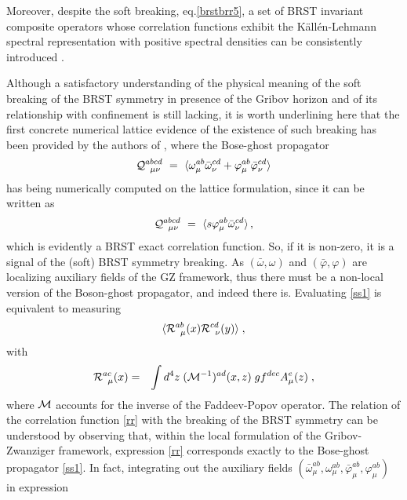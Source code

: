 Moreover, despite the soft breaking, eq.\eqref{brstbrr5}, a set of BRST  invariant composite operators whose correlation functions exhibit the K{\"a}ll{\'e}n-Lehmann spectral representation with positive spectral densities can be consistently introduced \cite{Baulieu:2009ha}. 

Although a satisfactory understanding of the physical meaning of the soft breaking of the BRST
symmetry in presence of the Gribov horizon and of its relationship with confinement is still
lacking, it is worth  underlining here that the first concrete numerical lattice evidence  of
the existence of such breaking has been provided by the authors of \cite{Cucchieri:2014via},
where the Bose-ghost propagator 
\begin{eqnarray}
{\cal Q}^{abcd}_{\;\;\mu\nu} ~=~ \langle \omega^{ab}_{\mu} \bar{\omega}^{cd}_{\nu} +
\varphi^{ab}_{\mu}
\bar{\varphi}^{cd}_{\nu}   \rangle
\label{ss1}
\end{eqnarray}
has being numerically computed on the lattice formulation, since it can be written as
\begin{eqnarray}
{\cal Q}^{abcd}_{\;\;\mu\nu} ~=~ \langle s\varphi^{ab}_{\mu}\bar{\omega}^{cd}_{\nu} \rangle\,,
\label{ss1}
\end{eqnarray}
which is evidently a BRST exact correlation function. So, if it is non-zero, it is a signal of
the (soft) BRST symmetry breaking. As $(\bar{\omega},\omega)$ and $(\bar{\varphi},\varphi)$
are localizing auxiliary fields of the GZ framework, thus there must be a non-local version of
the Boson-ghost propagator, and indeed there is. Evaluating \eqref{ss1} is equivalent to
measuring
\begin{eqnarray} 
\langle {\cal R}^{ab}_{\;\;\mu}(x)  {\cal R}^{cd}_{\;\;\nu}(y) \rangle    \;, 
\label{rr} 
\end{eqnarray}
with
\begin{eqnarray}
{\cal R}^{ac}_{\;\;\mu}(x) & = &  \int d^4z\;  ({\cal M}^{-1})^{ad} (x,z) \; g f^{dec}
A^{e}_\mu(z)  \;, 
\label{ra} 
\end{eqnarray} 
where $\cal M$ accounts for the inverse of the Faddeev-Popov operator.
The relation of the correlation function \eqref{rr} with the breaking of the BRST symmetry can
be understood by observing that, within the local formulation of the Gribov-Zwanziger
framework, expression \eqref{rr} corresponds exactly to the Bose-ghost propagator \eqref{ss1}.
In fact, integrating out the auxiliary fields $(\bar{\omega}_\mu^{ab}, \omega_\mu^{ab}, \bar{\varphi}_\mu^{ab},\varphi_\mu^{ab})$ in expression 
